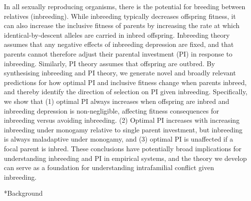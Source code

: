 \documentclass[12pt]{article}
\makeatletter
\renewcommand\section{\@startsection{section}{1}{0in}{-0.5\baselineskip}{0.1\baselineskip}{\normalfont\large\bfseries}}
\makeatother
\begin{document}
In all sexually reproducing organisms, there is the potential for breeding between relatives (inbreeding). While inbreeding typically decreases offspring fitness, it can also increase the inclusive fitness of parents by increasing the rate at which identical-by-descent alleles are carried in inbred offspring. Inbreeding theory assumes that any negative effects of inbreeding depression are fixed, and that parents cannot therefore adjust their parental investment (PI) in response to inbreeding. Similarly, PI theory assumes that offspring are outbred. By synthesising inbreeding and PI theory, we generate novel and broadly relevant predictions for how optimal PI and inclusive fitness change when parents inbreed, and thereby identify the direction of selection on PI given inbreeding. Specifically, we show that (1) optimal PI always increases when offspring are inbred and inbreeding depression is non-negligible, affecting fitness consequences for inbreeding versus avoiding inbreeding. (2) Optimal PI increases with increasing inbreeding under monogamy relative to single parent investment, but inbreeding is always maladaptive under monogamy, and (3) optimal PI is unaffected if a focal parent is inbred. These conclusions have potentially broad implications for understanding inbreeding and PI in empirical systems, and the theory we develop can serve as a foundation for understanding intrafamilial conflict given inbreeding.

\section*{Background}
\end{document}
